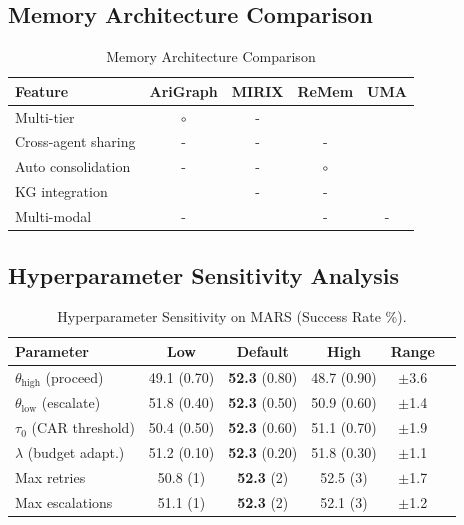 \documentclass{article}
\theoremstyle{plain}
\theoremstyle{definition}
\theoremstyle{remark}
\begin{document}
\subsection{Memory Architecture Comparison}
\begin{table}[h]
	\caption{Memory Architecture Comparison}
	\label{tab:memory_comparison}
	\centering
	\small
	\begin{tabular}{@{}lcccc@{}}
		\toprule
		\textbf{Feature} & \textbf{AriGraph} & \textbf{MIRIX} & \textbf{ReMem} & \textbf{UMA} \\
		\midrule
		Multi-tier & $\circ$ & - & \checkmark & \checkmark \\
		Cross-agent sharing & - & - & - & \checkmark \\
		Auto consolidation & - & - & $\circ$ & \checkmark \\
		KG integration & \checkmark & - & - & \checkmark \\
		Multi-modal & - & \checkmark & - & - \\
		\bottomrule
	\end{tabular}
\end{table}

\subsection{Hyperparameter Sensitivity Analysis}
\begin{table}[h]
	\caption{Hyperparameter Sensitivity on MARS (Success Rate \%).}
	\label{tab:sensitivity}
	\centering
	\small
	\begin{tabular}{@{}lccccc@{}}
		\toprule
		\textbf{Parameter} & \textbf{Low} & \textbf{Default} & \textbf{High} & \textbf{Range} \\
		\midrule
		$\theta_{\text{high}}$ (proceed) & 49.1 (0.70) & \textbf{52.3} (0.80) & 48.7 (0.90) & $\pm$3.6 \\
		$\theta_{\text{low}}$ (escalate) & 51.8 (0.40) & \textbf{52.3} (0.50) & 50.9 (0.60) & $\pm$1.4 \\
		$\tau_0$ (CAR threshold) & 50.4 (0.50) & \textbf{52.3} (0.60) & 51.1 (0.70) & $\pm$1.9 \\
		$\lambda$ (budget adapt.) & 51.2 (0.10) & \textbf{52.3} (0.20) & 51.8 (0.30) & $\pm$1.1 \\
		Max retries & 50.8 (1) & \textbf{52.3} (2) & 52.5 (3) & $\pm$1.7 \\
		Max escalations & 51.1 (1) & \textbf{52.3} (2) & 52.1 (3) & $\pm$1.2 \\
		\bottomrule
	\end{tabular}
\end{table}
\end{document}
